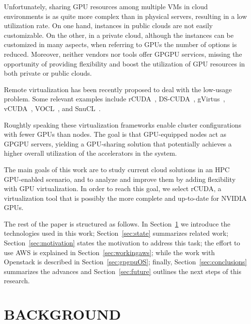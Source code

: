 \documentclass[a4paper,twoside]{article}
\begin{document}
Unfortunately, sharing GPU resources among multiple VMs in cloud environments 
is as quite more complex than in physical servers, resulting in a low utilization rate.
On one hand, instances in public clouds are not easily customizable. 
On the other, in a private cloud, although the instances can be customized in many aspects, when referring to GPUs
the number of options is reduced.
Moreover, neither vendors nor tools offer GPGPU services, missing the opportunity of providing flexibility and boost the utilization of GPU resources in both private or public clouds.

Remote virtualization has been recently proposed to deal with the low-usage problem. Some relevant examples include {rCUDA}~\cite{tonithesis},
DS-CUDA~\cite{dscuda}, gVirtus~\cite{gvirtus}, vCUDA~\cite{vcuda}, VOCL~\cite{vocl}, and SnuCL~\cite{snucl}.

Roughtly speaking these virtualization frameworks 
enable cluster configurations with fewer GPUs than nodes.  The goal is that 
GPU-equipped nodes act as GPGPU servers, yielding a GPU-sharing solution that potentially achieves
a higher overall utilization of the accelerators in the system.

The main goals of this work are to study current cloud solutions in an HPC GPU-enabled scenario, and to analyze and improve 
them by adding flexibility with GPU virtualization. In order to reach 
this goal, we select rCUDA, a virtualization tool that is possibly the more complete 
and up-to-date for NVIDIA GPUs.

The rest of the paper is structured as follows. 
In Section~\ref{sec:background} we introduce the technologies used in this work;
Section~\ref{sec:state} summarizes related work; 
Section~\ref{sec:motivation} states the motivation to address this task;
the effort to use AWS is explained in Section~\ref{sec:workingaws};
while the work with Openstack is described in Section~\ref{sec:gpgpuOS};
finally, Section~\ref{sec:conclusions} summarizes the advances and Section~\ref{sec:future} outlines the next steps
 of this research.

\section{\uppercase{Background}}
\label{sec:background}
\end{document}
